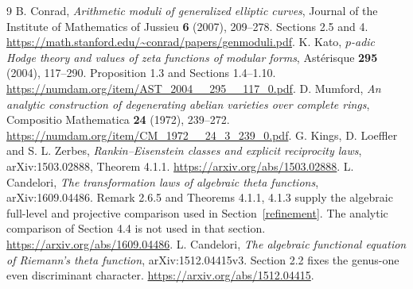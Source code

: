 \documentclass[11pt]{article}
\theoremstyle{remark}\newtheorem{remark}[theorem]{Remark}
\begin{document}
\begin{thebibliography}{9}
 B. Conrad, \emph{Arithmetic moduli of generalized elliptic
curves}, Journal of the Institute of Mathematics of Jussieu
\textbf{6} (2007), 209--278. Sections 2.5 and 4.
\url{https://math.stanford.edu/~conrad/papers/genmoduli.pdf}.
 K. Kato, \emph{$p$-adic Hodge theory and values of zeta
functions of modular forms}, Ast\'erisque \textbf{295} (2004), 117--290.
Proposition 1.3 and Sections 1.4--1.10.
\url{https://numdam.org/item/AST_2004__295__117_0.pdf}.
 D. Mumford, \emph{An analytic construction of degenerating
abelian varieties over complete rings}, Compositio Mathematica
\textbf{24} (1972), 239--272.
\url{https://numdam.org/item/CM_1972__24_3_239_0.pdf}.
 G. Kings, D. Loeffler and S. L. Zerbes,
\emph{Rankin--Eisenstein classes and explicit reciprocity laws},
arXiv:1503.02888, Theorem 4.1.1.
\url{https://arxiv.org/abs/1503.02888}.
 L. Candelori, \emph{The transformation laws of algebraic
theta functions}, arXiv:1609.04486.
Remark 2.6.5 and Theorems 4.1.1, 4.1.3 supply the algebraic
full-level and projective comparison used in Section~\ref{refinement}.
The analytic comparison of Section 4.4 is not used in that section.
\url{https://arxiv.org/abs/1609.04486}.
 L. Candelori, \emph{The algebraic functional
 equation of Riemann's theta function}, arXiv:1512.04415v3.
Section 2.2 fixes the genus-one even discriminant character.
\url{https://arxiv.org/abs/1512.04415}.
\end{thebibliography}
\end{document}
